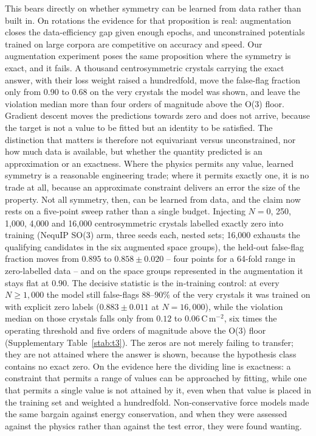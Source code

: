 This bears directly on whether symmetry can be learned from data rather than built in. On rotations the evidence for that proposition is real: augmentation closes the data-efficiency gap given enough epochs, and unconstrained potentials trained on large corpora are competitive on accuracy and speed. Our augmentation experiment poses the same proposition where the symmetry is exact, and it fails. A thousand centrosymmetric crystals carrying the exact answer, with their loss weight raised a hundredfold, move the false-flag fraction only from 0.90 to 0.68 on the very crystals the model was shown, and leave the violation median more than four orders of magnitude above the O(3) floor. Gradient descent moves the predictions towards zero and does not arrive, because the target is not a value to be fitted but an identity to be satisfied. The distinction that matters is therefore not equivariant versus unconstrained, nor how much data is available, but whether the quantity predicted is an approximation or an exactness. Where the physics permits any value, learned symmetry is a reasonable engineering trade; where it permits exactly one, it is no trade at all, because an approximate constraint delivers an error the size of the property. Not all symmetry, then, can be learned from data, and the claim now rests on a five-point sweep rather than a single budget. Injecting $N = 0$, 250, 1{,}000, 4{,}000 and 16{,}000 centrosymmetric crystals labelled exactly zero into training (NequIP SO(3) arm, three seeds each, nested sets; 16,000 exhausts the qualifying candidates in the six augmented space groups), the held-out false-flag fraction moves from $0.895$ to $0.858 \pm 0.020$ -- four points for a 64-fold range in zero-labelled data -- and on the space groups represented in the augmentation it stays flat at $0.90$. The decisive statistic is the in-training control: at every $N \geq 1{,}000$ the model still false-flags $88$--$90\%$ of the very crystals it was trained on with explicit zero labels ($0.883 \pm 0.011$ at $N = 16{,}000$), while the violation median on those crystals falls only from $0.12$ to $0.06$\,C\,m$^{-2}$, six times the operating threshold and five orders of magnitude above the O(3) floor (Supplementary Table~\ref{stab:t3}). The zeros are not merely failing to transfer; they are not attained where the answer is shown, because the hypothesis class contains no exact zero. On the evidence here the dividing line is exactness: a constraint that permits a range of values can be approached by fitting, while one that permits a single value is not attained by it, even when that value is placed in the training set and weighted a hundredfold. Non-conservative force models made the same bargain against energy conservation, and when they were assessed against the physics rather than against the test error, they were found wanting\cite{bigi2025forces}.

